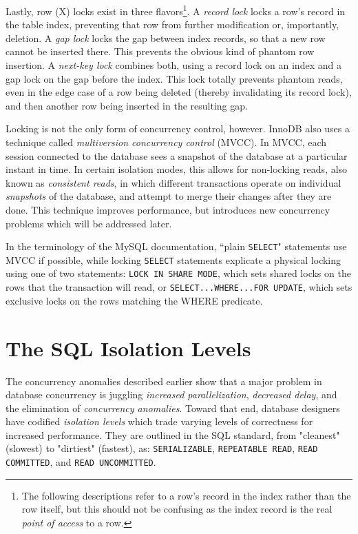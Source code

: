 \documentclass[12pt]{article} %
\begin{document}
Lastly, row (X) locks exist in three flavors\footnote{The following descriptions refer to a row's record in the index rather than the row itself, but this should not be confusing as the index record is the real \textsl{point of access} to a row.}. A \textsl{record lock} locks a row's record in the table index, preventing that row from further modification or, importantly, deletion. A \textsl{gap lock} locks the gap between index records, so that a new row cannot be inserted there.  This prevents the obvious kind of phantom row insertion. A \textsl{next-key lock} combines both, using a record lock on an index and a gap lock on the gap before the index. This lock totally prevents phantom reads, even in the edge case of a row being deleted (thereby invalidating its record lock), and then another row being inserted in the resulting gap.

Locking is not the only form of concurrency control, however. InnoDB also uses a technique called \textsl{multiversion concurrency control} (MVCC). In MVCC, each session connected to the database sees a snapshot of the database at a particular instant in time. In certain isolation modes, this allows for non-locking reads, also known as \textsl{consistent reads}, in which different transactions operate on individual \textsl{snapshots} of the database, and attempt to merge their changes after they are done. This technique improves performance, but introduces new concurrency problems which will be addressed later. 

In the terminology of the MySQL documentation, ``plain \texttt{SELECT}" statements use MVCC if possible, while locking \texttt{SELECT} statements explicate a physical locking using one of two statements: \texttt{LOCK IN SHARE MODE}, which sets shared locks on the rows that the transaction will read, or \texttt{SELECT...WHERE...FOR UPDATE}, which sets exclusive locks on the rows matching the WHERE predicate.

\section{The SQL Isolation Levels}
The concurrency anomalies described earlier show that a major problem in database concurrency is juggling \textsl{increased parallelization}, \textsl{decreased delay}, and the elimination of \textsl{concurrency anomalies}. Toward that end, database designers have codified \textsl{isolation levels} which trade varying levels of correctness for increased performance. They are outlined in the SQL standard, from "cleanest" (slowest) to "dirtiest" (fastest), as: \texttt{SERIALIZABLE}, \texttt{REPEATABLE READ}, \texttt{READ COMMITTED}, and \texttt{READ UNCOMMITTED}.
\end{document}
